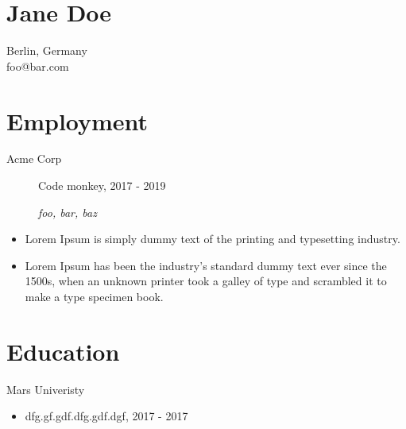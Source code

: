 \documentclass[10pt]{article}
\begin{document}
\section{Jane Doe}
Berlin, Germany\\
foo@bar.com

\section{Employment}

\begin{description}
    \item [Acme Corp] Code monkey, 2017 - 2019
    \item [] \footnotesize\textsl{
     foo,  bar,  baz 
    }
\end{description}
\begin{itemize}
    
    \item Lorem Ipsum is simply dummy text of the printing and typesetting industry.
    
    \item Lorem Ipsum has been the industry's standard dummy text ever since the 1500s, when an unknown printer took a galley of type and scrambled it to make a type specimen book.
    
\end{itemize}

\section{Education}

\begin{description}
    \item [Mars Univeristy]
\end{description}
\begin{itemize}
    \item dfg.gf.gdf.dfg.gdf.dgf, 2017 - 2017
\end{itemize}
\end{document}
